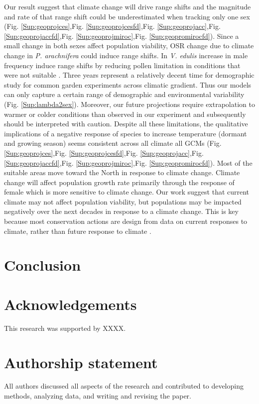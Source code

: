 \documentclass[12pt]{article}
\begin{document}
Our result suggest that climate change will drive range shifts and the magnitude and rate of that range shift could be underestimated when tracking only one sex (Fig. \ref{Sup:geoprojces},Fig. \ref{Sup:geoprojcesfd},Fig. \ref{Sup:geoprojacc},Fig. \ref{Sup:geoprojaccfd},Fig. \ref{Sup:geoprojmiroc},Fig. \ref{Sup:geopromirocfd}). 
Since a small change in both sexes affect population viability, OSR change due to climate change in \emph{P. arachnifera} could induce range shifts.
In \emph{V. edulis} increase in male frequency induce range shifts by reducing pollen limitation in conditions that were not suitable \citep{petry2016sex}. 
Three years represent a relatively decent time for demographic study for common garden experiments across climatic gradient.
Thus our models can only capture a certain range of demographic and environmental variability (Fig. \ref{Sup:lambda2sex}).
Moreover, our future projections require extrapolation to warmer or colder conditions than observed in our experiment and subsequently should be interpreted with caution. 
Despite all these limitations, the qualitative implications of a negative response of species to increase temperature (dormant and growing season) seems consistent across all climate all GCMs (Fig. \ref{Sup:geoprojces},Fig. \ref{Sup:geoprojcesfd},Fig. \ref{Sup:geoprojacc},Fig. \ref{Sup:geoprojaccfd},Fig. \ref{Sup:geoprojmiroc},Fig. \ref{Sup:geopromirocfd}).  
Most of the suitable areas move toward the North in response to climate change.
Climate change will affect population growth rate primarily through the response of female which is more sensitive to climate change.  
Our work suggest that current climate may not affect population viability, but populations may be impacted negatively over the next decades in response to a climate change. 
This is key because most conservation actions are design from  data on current responses to climate, rather than future response to climate \citep{sletvold2013climate}. 

\section*{Conclusion}



\section*{Acknowledgements}
This research was supported by XXXX.

\section*{Authorship statement}
All authors discussed all aspects of the research and contributed to developing methods, analyzing data, and writing and revising the paper.  
\end{document}
